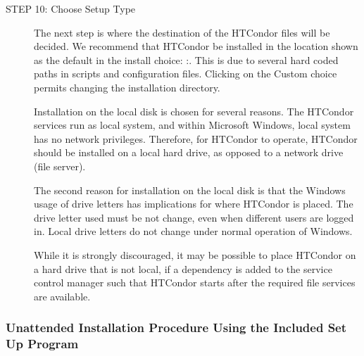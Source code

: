 \begin{description}
\item[STEP 10: Choose Setup Type]

The next step is where the destination of the HTCondor files will be
decided.
We recommend that HTCondor be installed in the location shown as the default 
in the install choice:
\verb@C:\Condor@. This is due to several hard coded
paths in scripts and configuration files.
Clicking on the Custom choice permits changing the installation directory.

Installation on the local disk is chosen for several reasons.
The HTCondor services run as local system, and within Microsoft Windows, 
local system has no network privileges.
Therefore, for HTCondor to operate, 
HTCondor should be installed on a local hard drive,
as opposed to a network drive (file server).

The second reason for installation on the local disk is that
the Windows usage of drive letters has implications for where
HTCondor is placed.
The drive letter used must be not change, even when different users are
logged in.
Local drive letters do not change under normal operation of Windows.

While it is strongly discouraged, 
it may be possible to place HTCondor on a hard drive that is not local,
if a dependency is added to the service control manager
such that HTCondor starts after the required file services
are available.


\end{description}


\subsubsection{\label{sec:nt-unattended-install-procedure}
Unattended Installation Procedure Using the Included Set Up Program}

